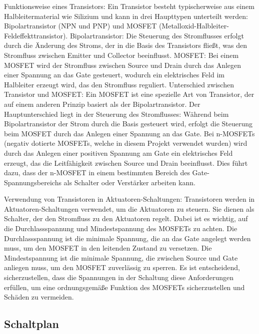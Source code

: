 \begin{enumerate}
Funktionsweise eines Transistors:
Ein Transistor besteht typischerweise aus einem Halbleitermaterial wie Silizium und kann in drei Haupttypen unterteilt
werden: Bipolartransistor (NPN und PNP) und MOSFET (Metalloxid-Halbleiter-Feldeffekttransistor).  \newline
Bipolartransistor: Die Steuerung des Stromflusses erfolgt durch die Änderung des Stroms, der in die Basis des
Transistors fließt, was den Stromfluss zwischen Emitter und Collector beeinflusst. \newline
MOSFET: Bei einem MOSFET wird der Stromfluss zwischen Source und Drain durch das Anlegen einer Spannung an das Gate
gesteuert, wodurch ein elektrisches Feld im Halbleiter erzeugt wird, das den Stromfluss reguliert. \newline
Unterschied zwischen Transistor und MOSFET: \newline
Ein MOSFET ist eine spezielle Art von Transistor, der auf einem anderen Prinzip basiert als der Bipolartransistor. Der
Hauptunterschied liegt in der Steuerung des Stromflusses: Während beim Bipolartransistor der Strom durch die Basis
gesteuert wird, erfolgt die Steuerung beim MOSFET durch das Anlegen einer Spannung an das Gate.
Bei n-MOSFETs (negativ dotierte MOSFETs, welche in diesem Projekt verwendet wurden) wird durch das Anlegen einer
positiven Spannung am Gate ein
elektrisches Feld erzeugt, das die Leitfähigkeit zwischen Source und Drain beeinflusst. Dies führt dazu, dass der n-MOSFET
in einem bestimmten Bereich des Gate-Spannungsbereichs als Schalter oder Verstärker arbeiten kann. \newline

Verwendung von Transistoren in Aktuatoren-Schaltungen:
Transistoren werden in Aktuatoren-Schaltungen verwendet, um die Aktuatoren
zu steuern. Sie dienen als Schalter, der den Stromfluss zu den Aktuatoren regelt.
Dabei ist es wichtig, auf die Durchlassspannung und Mindestspannung des MOSFETs zu achten. Die Durchlassspannung ist die
minimale Spannung, die an das Gate angelegt werden muss, um den MOSFET in den leitenden Zustand zu versetzen. Die
Mindestspannung ist die minimale Spannung, die zwischen Source und Gate anliegen muss, um den MOSFET zuverlässig zu
sperren. Es ist entscheidend, sicherzustellen, dass die Spannungen in der Schaltung diese Anforderungen erfüllen, um
eine ordnungsgemäße Funktion des MOSFETs sicherzustellen und Schäden zu vermeiden.


\subsection{Schaltplan}


\end{enumerate}
